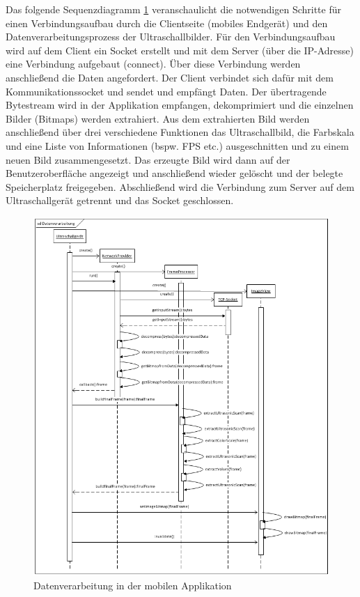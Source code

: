 Das folgende Sequenzdiagramm \ref{fig:SD_Datenverarbeitung} veranschaulicht die notwendigen Schritte für einen Verbindungsaufbau durch die Clientseite (mobiles Endgerät) und den Datenverarbeitungsprozess der Ultraschallbilder. Für den Verbindungsaufbau wird auf dem Client ein Socket erstellt und mit dem Server (über die IP-Adresse) eine Verbindung aufgebaut (connect). Über diese Verbindung werden anschließend die Daten angefordert. Der Client verbindet sich dafür mit dem Kommunikationssocket und sendet und empfängt Daten. Der übertragende Bytestream wird in der Applikation empfangen, dekomprimiert und die einzelnen Bilder (Bitmaps) werden extrahiert. Aus dem extrahierten Bild werden anschließend über drei verschiedene Funktionen das Ultraschallbild, die Farbskala und eine Liste von Informationen (bspw. FPS etc.) ausgeschnitten und zu einem neuen Bild zusammengesetzt. Das erzeugte Bild wird dann auf der Benutzeroberfläche angezeigt und anschließend wieder gelöscht und der belegte Speicherplatz freigegeben. Abschließend wird die Verbindung zum Server auf dem Ultraschallgerät getrennt und das Socket geschlossen.

\begin{figure}[H] 
\centering
\includegraphics[width=1\textwidth]{Bilder/objektorientierteAnalyseundEntwurf/SD_Datenverarbeitung}
\caption{{\small Datenverarbeitung in der mobilen Applikation}}
\label{fig:SD_Datenverarbeitung}
\end{figure}

